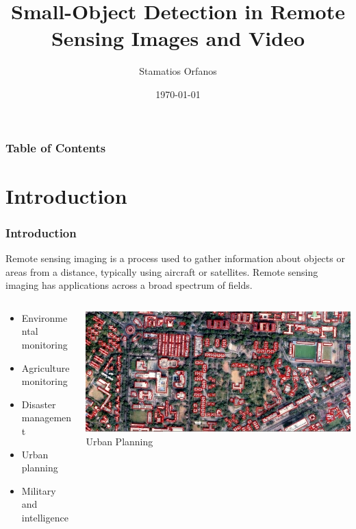 \documentclass{beamer}
\title{Small-Object Detection in Remote Sensing Images and Video}
\author{Stamatios Orfanos}
\institute{University of Piraeus \hspace*{1cm} NCSR Demokritos}
\date{\today}
\begin{document}
\begin{frame}
  \titlepage
\end{frame}

\begin{frame}
  \frametitle{Table of Contents}
  \tableofcontents
\end{frame}

\section{Introduction}
\begin{frame}[t]
  \frametitle{Introduction}
  Remote sensing imaging is a process used to gather information about objects or areas from a distance, typically using aircraft or satellites.
  Remote sensing imaging has applications across a broad spectrum of fields.
  
  \begin{columns}[T]
    \begin{column}{.4\textwidth}
      \begin{itemize}
        \item Environmental monitoring  
        \item Agriculture monitoring    
        \item Disaster management       
        \item Urban planning            
        \item Military and intelligence 
      \end{itemize}
    \end{column}
    \begin{column}{.6\textwidth}
      \begin{center}
        \includegraphics[width=\linewidth]{Figures/urban_planning_cropped.jpg} \\
        \small{Urban Planning}
      \end{center}
    \end{column}
  \end{columns}
\end{frame}
\end{document}
